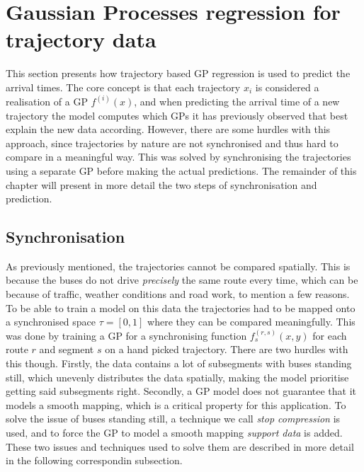 \section{Gaussian Processes regression for trajectory data}
This section presents how trajectory based GP regression is used to predict the arrival times. The core concept is that each trajectory $x_i$ is considered a realisation of a GP $f^{(i)}(x)$, and when predicting the arrival time of a new trajectory the model computes which GPs it has previously observed that best explain the new data according. However, there are some hurdles with this approach, since trajectories by nature are not synchronised and thus hard to compare in a meaningful way. This was solved by synchronising the trajectories using a separate GP before making the actual predictions. The remainder of this chapter will present in more detail the two steps of synchronisation and prediction.

\subsection{Synchronisation}
As previously mentioned, the trajectories cannot be compared spatially. This is because the buses do not drive \textit{precisely} the same route every time, which can be because of traffic, weather conditions and road work, to mention a few reasons. To be able to train a model on this data the trajectories had to be mapped onto a synchronised space $\tau = [0, 1]$ where they can be compared meaningfully. This was done by training a GP for a synchronising function $f^{(r,s)}_s(x, y)$ for each route $r$ and segment $s$ on a hand picked trajectory. There are two hurdles with this though. Firstly, the data contains a lot of subsegments with buses standing still, which unevenly distributes the data spatially, making the model prioritise getting said subsegments right. Secondly, a GP model does not guarantee that it models a smooth mapping, which is a critical property for this application. To solve the issue of buses standing still, a technique we call \textit{stop compression} is used, and to force the GP to model a smooth mapping \textit{support data} is added. These two issues and techniques used to solve them are described in more detail in the following correspondin subsection.

